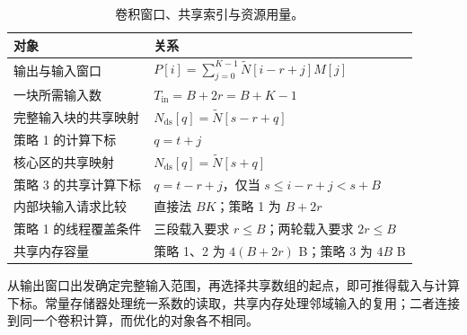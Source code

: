 \begin{table}[H]
\centering\small
\begin{tabularx}{\textwidth}{@{}p{}Y@{}}
\toprule
对象 & 关系 \\
\midrule
输出与输入窗口 & $P[i]=\sum_{j=0}^{K-1}\widetilde N[i-r+j]M[j]$ \\
一块所需输入数 & $T_{\mathrm{in}}=B+2r=B+K-1$ \\
完整输入块的共享映射 & $N_{\mathrm{ds}}[q]=\widetilde N[s-r+q]$ \\
策略 1 的计算下标 & $q=t+j$ \\
核心区的共享映射 & $N_{\mathrm{ds}}[q]=\widetilde N[s+q]$ \\
策略 3 的共享计算下标 & $q=t-r+j$，仅当 $s\le i-r+j<s+B$ \\
内部块输入请求比较 & 直接法 $BK$；策略 1 为 $B+2r$ \\
策略 1 的线程覆盖条件 & 三段载入要求 $r\le B$；两轮载入要求 $2r\le B$ \\
共享内存容量 & 策略 1、2 为 $4(B+2r)$ B；策略 3 为 $4B$ B \\
\bottomrule
\end{tabularx}
\caption{卷积窗口、共享索引与资源用量。}
\end{table}

从输出窗口出发确定完整输入范围，再选择共享数组的起点，即可推得载入与计算下标。常量存储器处理统一系数的读取，共享内存处理邻域输入的复用；二者连接到同一个卷积计算，而优化的对象各不相同。
\FloatBarrier
